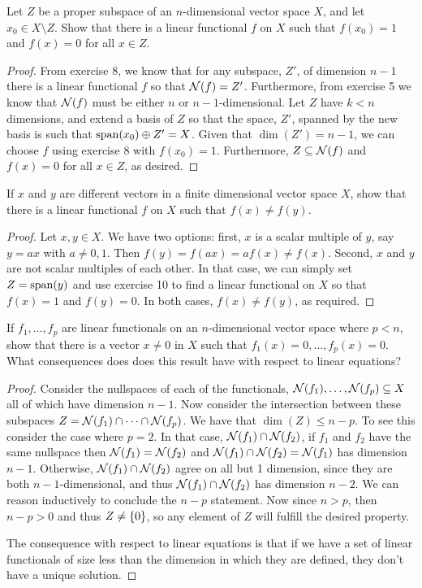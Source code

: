 \begin{exercise}{10}
Let $Z$ be a proper subspace of an $n$-dimensional vector space $X$, and let $x_0\in X\setminus Z$.
Show that there is a linear functional $f$ on $X$ such that $f(x_0)=1$ and $f(x)=0$ for all $x\in Z$.
\end{exercise}
\begin{proof}
From exercise 8, we know that for any subspace, $Z'$, of dimension $n-1$ there is a linear functional $f$ so that $\mathcal{N}(f)=Z'$.
Furthermore, from exercise 5 we know that $\mathcal{N}(f)$ must be either $n$ or $n-1$-dimensional.
Let $Z$ have $k<n$ dimensions, and extend a basis of $Z$ so that the space, $Z'$, spanned by the new basis is such that $\operatorname*{span}(x_0)\oplus Z'=X$.
Given that $\dim(Z')=n-1$, we can choose $f$ using exercise 8 with $f(x_0)=1$.
Furthermore, $Z\subseteq\mathcal{N}(f)$ and $f(x)=0$ for all $x\in Z$, as desired.
\end{proof}

\begin{exercise}{11}
If $x$ and $y$ are different vectors in a finite dimensional vector space $X$, show that there is a linear functional $f$ on $X$ such that $f(x)\neq f(y)$.
\end{exercise}
\begin{proof}
Let $x,y\in X$.
We have two options:
first, $x$ is a scalar multiple of $y$, say $y=ax$ with $a\neq 0,1$.
Then $f(y)=f(ax)=af(x)\neq f(x)$.
Second, $x$ and $y$ are not scalar multiples of each other.
In that case, we can simply set $Z=\operatorname*{span}(y)$ and use exercise 10 to find a linear functional on $X$ so that $f(x)=1$ and $f(y)=0$.
In both cases, $f(x)\neq f(y)$, as required.
\end{proof}

\begin{exercise}{12}
If $f_1,\dots,f_p$ are linear functionals on an $n$-dimensional vector space where $p<n$, show that there is a vector $x\neq 0$ in $X$ such that $f_1(x)=0,\dots,f_p(x)=0$. 
What consequences does does this result have with respect to linear equations?
\end{exercise}
\begin{proof}
Consider the nullspaces of each of the functionals, $\mathcal{N}(f_1),\dots,\mathcal{N}(f_p)\subseteq X$ all of which have dimension $n-1$.
Now consider the intersection between these subspaces $Z=\mathcal{N}(f_1)\cap\dots\cap\mathcal{N}(f_p)$.
We have that $\dim(Z)\leq n-p$.
To see this consider the case where $p=2$.
In that case, $\mathcal{N}(f_1)\cap\mathcal{N}(f_2)$, if $f_1$ and $f_2$ have the same nullspace then $\mathcal{N}(f_1)=\mathcal{N}(f_2)$ and $\mathcal{N}(f_1)\cap\mathcal{N}(f_2)=\mathcal{N}(f_1)$ has dimension $n-1$.
Otherwise, $\mathcal{N}(f_1)\cap\mathcal{N}(f_2)$ agree on all but 1 dimension, since they are both $n-1$-dimensional, and thus $\mathcal{N}(f_1)\cap\mathcal{N}(f_2)$ has dimension $n-2$.
We can reason inductively to conclude the $n-p$ statement.
Now since $n>p$, then $n-p>0$ and thus $Z\neq \{0\}$, so any element of $Z$ will fulfill the desired property.

The consequence with respect to linear equations is that if we have a set of linear functionals of size less than the dimension in which they are defined, they don't have a unique solution.
\end{proof}

